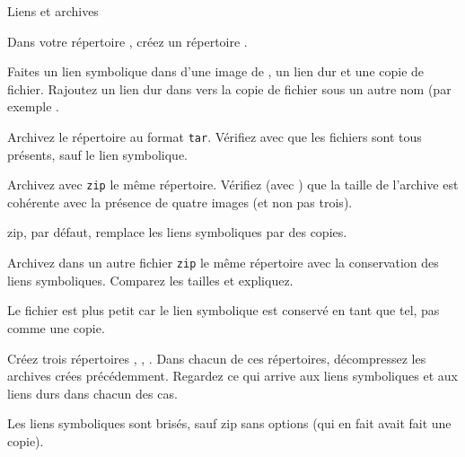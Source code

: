 \begin{exercice}
  \begin{exercicelet}{Liens et archives}
    \begin{questions}
    \item Dans votre répertoire , créez
      un répertoire .
    \item Faites un lien symbolique dans  d'une image de
      , un lien dur et une copie de fichier. Rajoutez un
      lien dur dans  vers la copie de fichier sous un
      autre nom (par exemple .
    \item Archivez le répertoire  au format \texttt{tar}. Vérifiez avec
       que les fichiers sont tous présents,
      sauf le lien symbolique.
    \item Archivez avec \texttt{zip} le même répertoire. Vérifiez (avec
      ) que la taille de l'archive est cohérente avec
      la présence de quatre images (et non pas trois).
      \begin{correction}
        zip, par défaut, remplace les liens symboliques par des copies.
      \end{correction}
    \item Archivez dans un autre fichier \texttt{zip} le même répertoire
      avec la conservation des liens symboliques. Comparez les tailles
      et expliquez.
      \begin{correction}
        Le fichier est plus petit car le lien symbolique est conservé en
        tant que tel, pas comme une copie.
      \end{correction}
    \item Créez trois répertoires , , . Dans
      chacun de ces répertoires, décompressez les archives crées
      précédemment. Regardez ce qui arrive aux liens symboliques et aux
      liens durs dans chacun des cas.
      \begin{correction}
        Les liens symboliques sont brisés, sauf zip sans options (qui en
        fait avait fait une copie).
      \end{correction}
    \end{questions}
  \end{exercicelet}
\end{exercice}

